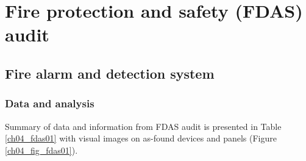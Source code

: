 \section{Fire protection and safety (FDAS) audit} \label{ch04fdas}



\subsection{Fire alarm and detection system} \label{ch04fdas01}
\subsubsection{Data and analysis}
Summary of data and information from FDAS audit is presented in Table \ref{ch04_fdas01} with visual images on as-found devices and panels (Figure \ref{ch04_fig_fdas01}).

